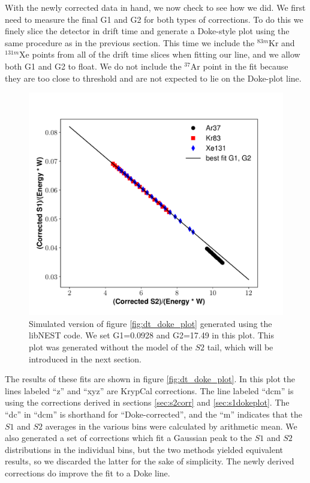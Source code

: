 {With the newly corrected data in hand, we now check to see how we did. We first need to measure the final G1 and G2 for both types of corrections. To do this we finely slice the detector in drift time and generate a Doke-style plot using the same procedure as in the previous section. This time we include the $^{83m}$Kr and $^{131m}$Xe points from all of the drift time slices when fitting our line, and we allow both G1 and G2 to float. We do not include the $^{37}$Ar point in the fit because they are too close to threshold and are not expected to lie on the Doke-plot line. 
\begin{figure}[h!]
\centering
\includegraphics[width=150mm]{Figures/NEST_g1g2_dcm.pdf}
\caption{Simulated version of figure \ref{fig:dt_doke_plot} generated using the libNEST code. We set G1=0.0928 and G2=17.49 in this plot. This plot was generated without the model of the $S2$ tail, which will be introduced in the next section.}
\label{fig:dt_doke_plot_libnest} 
\end{figure}

The results of these fits are shown in figure \ref{fig:dt_doke_plot}. In this plot the lines labeled ``z'' and ``xyz'' are KrypCal corrections. The line labeled ``dcm'' is using the corrections derived in sections \ref{sec:s2corr} and \ref{sec:s1dokeplot}. The ``dc'' in ``dcm'' is shorthand for ``Doke-corrected'', and the ``m'' indicates that the $S1$ and $S2$ averages in the various bins were calculated by arithmetic mean. We also generated a set of corrections which fit a Gaussian peak to the $S1$ and $S2$ distributions in the individual bins, but the two methods yielded equivalent results, so we discarded the latter for the sake of simplicity. The newly derived corrections do improve the fit to a Doke line. 

}

